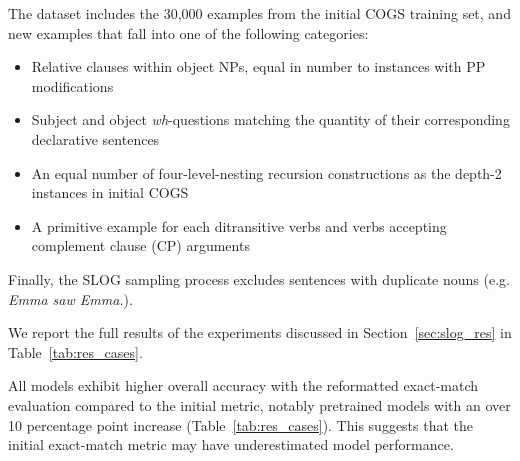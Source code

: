 The dataset includes the 30,000 examples from the initial COGS training set, and new examples that fall into one of the following categories: 
\begin{itemize}[itemsep=0pt, parsep=0pt, topsep=0pt]
    \item Relative clauses within object NPs, equal in number to instances with PP modifications
    \item Subject and object \emph{wh}-questions matching the quantity of their corresponding declarative sentences
    \item An equal number of four-level-nesting recursion constructions as the depth-2 instances in initial COGS
    \item A primitive example for each ditransitive verbs and verbs accepting complement clause (CP) arguments
\end{itemize}

\noindent Finally, the SLOG sampling process excludes sentences with duplicate nouns (e.g. \textit{Emma saw Emma.}).

 \label{sec:analysis_case}

We report the full results of the experiments discussed in Section~\ref{sec:slog_res} in Table~\ref{tab:res_cases}.

\label{app:metric}
All models exhibit higher overall accuracy with the reformatted exact-match evaluation compared to the initial metric, notably pretrained models with an over 10 percentage point increase (Table~\ref{tab:res_cases}). This suggests that the initial exact-match metric may have underestimated model performance.

